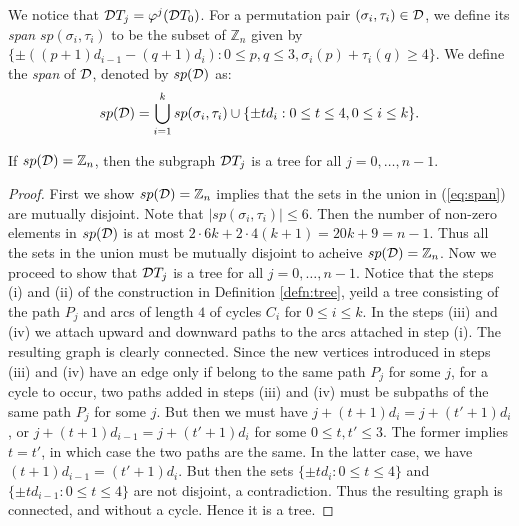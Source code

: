 \documentclass[11pt]{article}
\newcommand{\mb}{\mathbb}
\newcommand{\tr}[1]{{\cal D}T_#1}
\begin{document}
We notice that $\tr{j}=\varphi^j(\tr{0})$. For a permutation pair
$(\sigma_i,\tau_i)\in {\cal D}$, we define its {\em span} $sp(\sigma_i,\tau_i)$ to be
the subset of $\mb{Z}_n$ given by $\{\pm ((p+1)d_{i-1}-(q+1)d_i): 0\leq p,q\leq
3, \sigma_i(p)+\tau_i(q)\geq 4\}$. We define the {\em span} of ${\cal D}$, denoted by 
$sp({\cal D})$ as:
\begin{equation}\label{eq:span}
sp({\cal D}) = \displaystyle \bigcup_{i=1}^k sp(\sigma_i,\tau_i) \cup \{\pm td_i: 0\leq t\leq 4,
0\leq i\leq k\}.
\end{equation}

\begin{lemma}\label{lem:tree}
If $sp({\cal D})=\mathbb{Z}_n$, then the subgraph ${\cal D}T_j$ is a tree for all $j=0,\ldots,n-1$.
\end{lemma}
\begin{proof}
First we show $sp({\cal D})=\mathbb{Z}_n$ implies that the sets in the union
in (\ref{eq:span}) are mutually
disjoint. Note that $|sp(\sigma_i,\tau_i)|\leq 6$. Then the number of
non-zero elements in $sp({\cal D})$ is at most $2\cdot 6k+2\cdot
4(k+1)=20k+9=n-1$. Thus all the sets in the union must be mutually disjoint
to acheive $sp({\cal D})=\mathbb{Z}_n$. Now we proceed to show that ${\cal
D}T_j$ is a tree for all $j=0,\ldots,n-1$. Notice that the steps (i) and
(ii) of the construction in Definition \ref{defn:tree}, yeild a tree
consisting of the path $P_j$ and arcs of length $4$ of cycles $C_i$ for
$0\leq i\leq k$. In the steps (iii) and (iv) we attach upward and downward
paths to the arcs attached in step (i). The resulting graph is clearly
connected. Since the new vertices introduced in steps (iii) and (iv) have
an edge only if belong to the same path $P_j$ for some $j$, for a cycle to
occur, two paths added in steps (iii) and (iv) must be subpaths of the
same path $P_j$ for some $j$. But then we must have
$j+(t+1)d_i=j+(t'+1)d_i$, or $j+(t+1)d_{i-1} = j+(t'+1)d_i$ for some $0\leq
t,t'\leq 3$.  The former implies $t=t'$, in which case the two paths are
the same. In the latter case, we have $(t+1)d_{i-1}=(t'+1)d_i$. But then the sets
$\{\pm td_i: 0\leq t\leq 4\}$ and $\{\pm td_{i-1}: 0\leq t\leq 4\}$ are not
disjoint, a contradiction. Thus the resulting graph is
connected, and without a cycle. Hence it is a tree. 
\end{proof}
\end{document}
